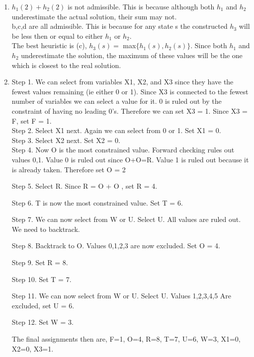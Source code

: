 \documentclass[11pt,fleqn]{article}
\begin{document}
\begin{enumerate}
\item %
$h_{1}(2)+h_{2}(2)$ is not admissible. This is because although both $h_{1}$ and $h_{2}$ underestimate the actual solution, their sum may not. \\

b,c,d are all admissible. This is because for any state s the constructed $h_{3}$ will be less then or equal to either $h_{1}$ or $h_{2}$. \\

The best heuristic is (c), $h_{3}(s) = $ max$\{h_{1}(s),h_{2}(s)\}$. Since both $h_{1}$ and $h_{2}$ underestimate the solution, the maximum of these values will be the one which is closest to the real solution. 


\item %
Step 1. We can select from variables X1, X2, and X3 since they have the fewest values remaining (ie either 0 or 1). Since X3 is connected to the fewest number of variables we can select a value for it. 0 is ruled out by the constraint of having no leading 0's. Therefore we can set X3 = 1. Since X3 = F, set F = 1. \\

Step 2. Select X1 next. Again we can select from 0 or 1. Set X1 = 0. \\

Step 3. Select X2 next. Set X2 = 0. \\

Step 4. Now O is the most constrained value. Forward checking rules out values 0,1. Value 0 is ruled out since O+O=R. Value 1 is ruled out because it is already taken. Therefore set O = 2 

Step 5. Select R. Since R = O + O , set R = 4. 

Step 6. T is now the most constrained value. Set T = 6. 

Step 7. We can now select from W or U. Select U. All values are ruled out. We need to backtrack. 

Step 8. Backtrack to O. Values 0,1,2,3 are now excluded. Set O = 4. 

Step 9. Set R = 8. 

Step 10. Set T = 7. 

Step 11. We can now select from W or U. Select U. Values 1,2,3,4,5 Are excluded, set U = 6. 

Step 12. Set W = 3. 

The final assignments then are, F=1, O=4, R=8, T=7, U=6, W=3, X1=0, X2=0, X3=1.


\end{enumerate}
\end{document}
